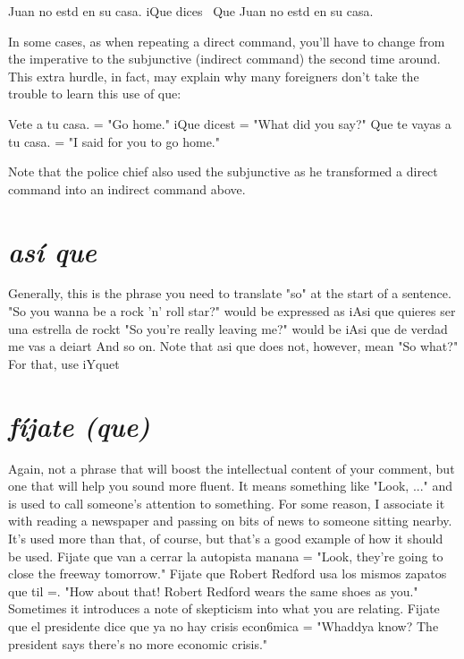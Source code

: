 \bsk

Juan no estd en su casa.
iQue dices~
Que Juan no estd en su casa.

\bsk

In some cases, as when repeating a direct command, you'll have to
change from the imperative to the subjunctive (indirect command) the
second time around. This extra hurdle, in fact, may explain why many
foreigners don't take the trouble to learn this use of que:

\bsk

Vete a tu casa. = "Go home."
iQue dicest = "What did you say?"
Que te vayas a tu casa. = "I said for you to go home."

\bsk

Note that the police chief also used the subjunctive as he transformed
a direct command into an indirect command above.

\section{\emph{así que}}

Generally, this is the phrase you need to translate "so" at the
start of a sentence. "So you wanna be a rock 'n' roll star?" would be
expressed as iAsi que quieres ser una estrella de rockt "So you're
really leaving me?" would be iAsi que de verdad me vas a deiart And
so on. Note that asi que does not, however, mean "So what?" For that,
use iYquet

\section{\emph{fíjate (que)}}

Again, not a phrase that will boost the intellectual content of
your comment, but one that will help you sound more fluent. It means
something like "Look, ..." and is used to call someone's attention to
something. For some reason, I associate it with reading a newspaper
and passing on bits of news to someone sitting nearby. It's used more
than that, of course, but that's a good example of how it should be
used. Fijate que van a cerrar la autopista manana = "Look, they're
going to close the freeway tomorrow." Fijate que Robert Redford usa
los mismos zapatos que til =. "How about that! Robert Redford wears
the same shoes as you." Sometimes it introduces a note of skepticism
into what you are relating. Fijate que el presidente dice que ya no hay
crisis econ6mica = "Whaddya know? The president says there's no
more economic crisis."

